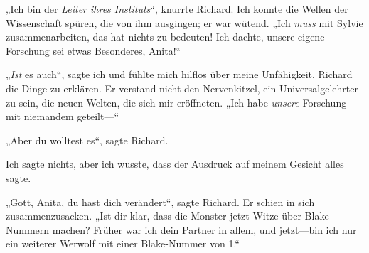 „Ich bin der \emph{Leiter ihres Instituts}“, knurrte Richard. Ich konnte die Wellen der Wissenschaft spüren, die von ihm ausgingen; er war wütend. „Ich \emph{muss} mit Sylvie zusammenarbeiten, das hat nichts zu bedeuten! Ich dachte, unsere eigene Forschung sei etwas Besonderes, Anita!“

„\emph{Ist} es auch“, sagte ich und fühlte mich hilflos über meine Unfähigkeit, Richard die Dinge zu erklären. Er verstand nicht den Nervenkitzel, ein Universalgelehrter zu sein, die neuen Welten, die sich mir eröffneten. „Ich habe \emph{unsere} Forschung mit niemandem geteilt—“

„Aber du wolltest es“, sagte Richard.

Ich sagte nichts, aber ich wusste, dass der Ausdruck auf meinem Gesicht alles sagte.

„Gott, Anita, du hast dich verändert“, sagte Richard. Er schien in sich zusammenzusacken. „Ist dir klar, dass die Monster jetzt Witze über Blake-Nummern machen? Früher war ich dein Partner in allem, und jetzt—bin ich nur ein weiterer Werwolf mit einer Blake-Nummer von 1.“

